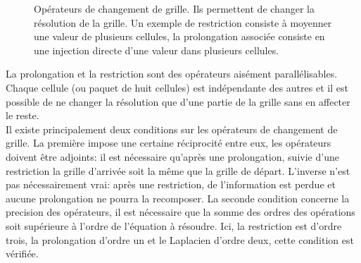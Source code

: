 \begin{figure}[htbp]
\begin{center}
\caption{Opérateurs de changement de grille. 
Ils permettent de changer la résolution de la grille. Un exemple de restriction consiste à moyenner une valeur de plusieurs cellules, la prolongation associée consiste en une injection directe d'une valeur dans plusieurs cellules.}
\label{Opérateurs de changement de grille}
\end{center}
\end{figure}

La prolongation et la restriction sont des opérateurs aisément parallélisables. Chaque cellule (ou paquet de huit cellules) est indépendante des autres et il est possible de ne changer la résolution que d'une partie de la grille sans en affecter le reste.\\

Il existe principalement deux conditions sur les opérateurs de changement de grille. 
La première impose une certaine réciprocité entre eux, les opérateurs doivent être adjoints: il est nécessaire qu'après une prolongation, suivie d'une restriction la grille d'arrivée soit la même que la grille de départ. 
L'inverse n'est pas nécessairement vrai: après une restriction, de l'information est perdue et aucune prolongation ne pourra la recomposer.
La seconde condition concerne la precision des opérateurs, il est nécessaire que la somme des ordres des opérations soit supérieure à l'ordre de l'équation à résoudre. 
Ici, la restriction est d'ordre trois, la prolongation d'ordre un et le Laplacien d'ordre deux, cette condition est vérifiée.


